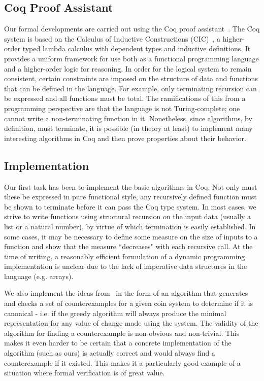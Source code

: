 \documentclass{sig-alternate}
\begin{document}
\subsection{Coq Proof Assistant}

Our formal developments are  carried out using the Coq proof assistant~\cite{coq12}. The Coq system is based on 
the Calculus of Inductive Constructions (CIC)~\cite{paulin93}, a higher-order typed lambda calculus with dependent types and inductive definitions. It provides a uniform framework for use  both as a functional programming language and a higher-order logic for reasoning. In order for the logical system to remain consistent, certain constraints are imposed on the structure of data  and functions that can be defined in the language. For example, only terminating recursion can be expressed and all functions must be total. The ramifications of this from a programming perspective are that the language is not Turing-complete; one cannot write a non-terminating function in it. Nonetheless, since algorithms, by definition, must terminate, it is possible (in theory at least) to implement many interesting algorithms in Coq and then prove properties about their behavior. 

\subsection{Implementation}

Our first task has been to implement the basic algorithms in Coq. Not only must these be expressed in pure functional style, any recursively defined function must be shown to terminate before it can pass the Coq type system. In most cases, we strive to write functions using structural recursion on the input data (usually a list or a natural number), by virtue of which termination is easily established. In some cases, it may be necessary to define some measure on the size of inputs to a function and show that the measure ``decreases" with each recursive call. At the time of writing, a reasonably efficient formulation of a dynamic programming implementation is unclear due to the lack of imperative data structures in the language (e.g. arrays).

We also implement the ideas from~\cite{pearson94} in the form of an algorithm that generates and checks a set of counterexamples for a given coin system to determine if it is canonical - i.e. if the greedy algorithm will always produce the minimal representation for any value of change made using the system. The validity of the algorithm for finding a counterexample is non-obvious and non-trivial. This makes it even harder to be certain that a concrete implementation of the algorithm (such as ours) is actually correct and would always find a counterexample if it existed. This makes it a particularly good example of a situation where formal verification is of great value. 
\end{document}
